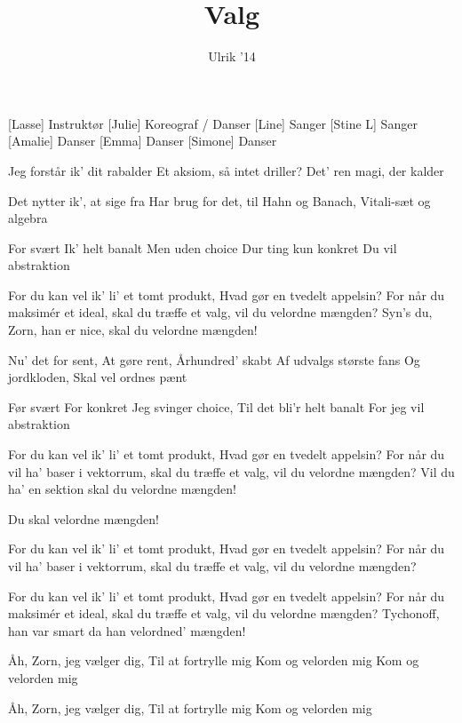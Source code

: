 \documentclass[a4paper,11pt]{article}
\title{Valg}
\author{Ulrik '14}
\begin{document}
\maketitle

\begin{roles}
[Lasse] Instruktør
[Julie] Koreograf / Danser
[Line] Sanger
[Stine L] Sanger
[Amalie] Danser
[Emma] Danser
[Simone] Danser
\end{roles}

\begin{song}
 Jeg forstår ik' dit rabalder
Et aksiom, så intet driller?
Det' ren magi, der kalder

 Det nytter ik', at sige fra
Har brug for det, til Hahn og Banach,
Vitali-sæt og algebra

 For svært
Ik' helt banalt
Men uden choice
Dur ting kun konkret
Du vil abstraktion

 For du kan vel ik' li' et tomt produkt,
Hvad gør en tvedelt appelsin?
For når du maksimér et ideal,
skal du træffe et valg,
vil du velordne mængden?
Syn's du, Zorn, han er nice,
skal du velordne mængden!

 Nu' det for sent,
At gøre rent,
Århundred' skabt
Af udvalgs største fans
Og jordkloden,
Skal vel ordnes pænt

 Før svært
For konkret
Jeg svinger choice,
Til det bli'r helt banalt
For jeg vil abstraktion

 For du kan vel ik' li' et tomt produkt,
Hvad gør en tvedelt appelsin?
For når du vil ha' baser i vektorrum,
skal du træffe et valg,
vil du velordne mængden?
Vil du ha' en sektion
skal du velordne mængden!

 Du skal velordne mængden!

 For du kan vel ik' li' et tomt produkt,
Hvad gør en tvedelt appelsin?
For når du vil ha' baser i vektorrum,
skal du træffe et valg,
vil du velordne mængden?

 For du kan vel ik' li' et tomt produkt,
Hvad gør en tvedelt appelsin?
For når du maksimér et ideal,
skal du træffe et valg,
vil du velordne mængden?
Tychonoff, han var smart
da han velordned' mængden!

 Åh, Zorn, jeg vælger dig,
Til at fortrylle mig
Kom og velorden mig
Kom og velorden mig

 Åh, Zorn, jeg vælger dig,
Til at fortrylle mig
Kom og velorden mig
\end{song}
\end{document}
